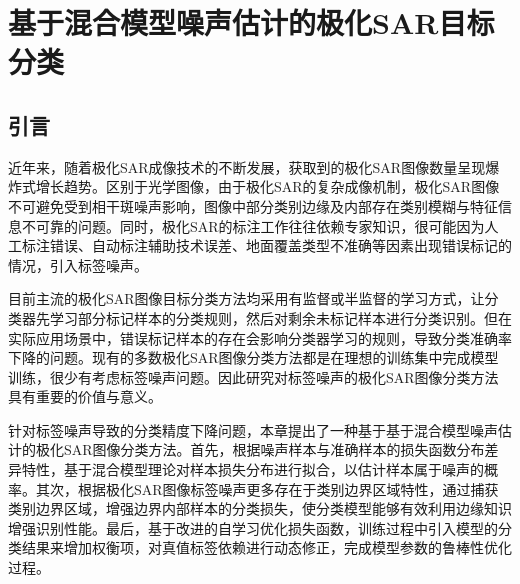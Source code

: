 \chapter{基于混合模型噪声估计的极化SAR目标分类}
\section{引言}

近年来，随着极化SAR成像技术的不断发展，获取到的极化SAR图像数量呈现爆炸式增长趋势。区别于光学图像，由于极化SAR的复杂成像机制，极化SAR图像不可避免受到相干斑噪声影响，图像中部分类别边缘及内部存在类别模糊与特征信息不可靠的问题。同时，极化SAR的标注工作往往依赖专家知识，很可能因为人工标注错误、自动标注辅助技术误差、地面覆盖类型不准确等因素出现错误标记的情况，引入标签噪声。

目前主流的极化SAR图像目标分类方法均采用有监督或半监督的学习方式，让分类器先学习部分标记样本的分类规则，然后对剩余未标记样本进行分类识别。但在实际应用场景中，错误标记样本的存在会影响分类器学习的规则，导致分类准确率下降的问题。现有的多数极化SAR图像分类方法都是在理想的训练集中完成模型训练，很少有考虑标签噪声问题。因此研究对标签噪声的极化SAR图像分类方法具有重要的价值与意义。

针对标签噪声导致的分类精度下降问题，本章提出了一种基于基于混合模型噪声估计的极化SAR图像分类方法。首先，根据噪声样本与准确样本的损失函数分布差异特性，基于混合模型理论对样本损失分布进行拟合，以估计样本属于噪声的概率。其次，根据极化SAR图像标签噪声更多存在于类别边界区域特性，通过捕获类别边界区域，增强边界内部样本的分类损失，使分类模型能够有效利用边缘知识增强识别性能。最后，基于改进的自学习优化损失函数，训练过程中引入模型的分类结果来增加权衡项，对真值标签依赖进行动态修正，完成模型参数的鲁棒性优化过程。

